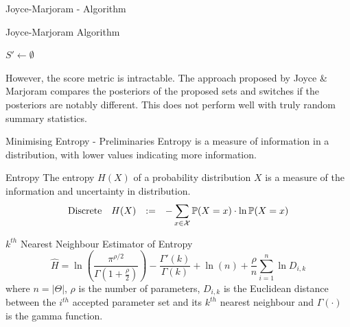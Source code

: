 \documentclass[aspectratio=169]{beamer}
\begin{document}
\begin{frame}{Joyce-Marjoram - Algorithm}
  \begin{block}{Joyce-Marjoram Algorithm}
    \begin{algorithm}[H]
      $S'\leftarrow\emptyset$\\
    \end{algorithm}
  \end{block}
  However, the score metric is intractable. The approach proposed by Joyce \& Marjoram compares the posteriors of the proposed sets and switches if the posteriors are notably different. This does not perform well with truly random summary statistics.
\end{frame}

\begin{frame}{Minimising Entropy - Preliminaries}
  Entropy is a measure of information in a distribution, with lower values indicating more information.
  \begin{block}{Entropy}
    {\small The entropy $H(X)$ of a probability distribution $X$ is a measure of the information and uncertainty in distribution.}
    \[\everymath={\displaystyle}\begin{array}{rrcl}
      \text{Discrete}&H(X)&:=&-\sum_{x\in\mathcal{X}}\mathbb{P}(X=x)\cdot\ln\mathbb{P}(X=x)%
    \end{array}\]
  \end{block}

  \begin{block}{$k^{th}$ Nearest Neighbour Estimator of Entropy}
    \[ \hat{H}=\ln\left(\frac{\pi^{\rho/2}}{\Gamma\left(1+\frac\rho2\right)}\right)-\frac{\Gamma'(k)}{\Gamma(k)}+\ln(n)+\frac\rho{n}\sum_{i=1}^n\ln D_{i,k} \]
    {\small where $n=|\Theta|$, $\rho$ is the number of parameters, $D_{i,k}$ is the Euclidean distance between the $i^{th}$ accepted parameter set and its $k^{th}$ nearest neighbour and $\Gamma(\cdot)$ is the gamma function.}
  \end{block}
\end{frame}
\end{document}
